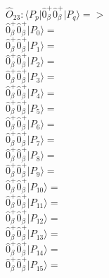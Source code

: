 \documentclass[14pt]{article}
\begin{document}
    $\hat{O}_{23}:  \langle{P_p}\vert \hat{0}_{\beta}^{+}\hat{0}_{\beta}^{+} \vert{P_q}\rangle => $ \\ 
    $ \hat{0}_{\beta}^{+}\hat{0}_{\beta}^{+} \vert{P_{0}}\rangle =  $ \\ 
    $ \hat{0}_{\beta}^{+}\hat{0}_{\beta}^{+} \vert{P_{1}}\rangle =  $ \\ 
    $ \hat{0}_{\beta}^{+}\hat{0}_{\beta}^{+} \vert{P_{2}}\rangle =  $ \\ 
    $ \hat{0}_{\beta}^{+}\hat{0}_{\beta}^{+} \vert{P_{3}}\rangle =  $ \\ 
    $ \hat{0}_{\beta}^{+}\hat{0}_{\beta}^{+} \vert{P_{4}}\rangle =  $ \\ 
    $ \hat{0}_{\beta}^{+}\hat{0}_{\beta}^{+} \vert{P_{5}}\rangle =  $ \\ 
    $ \hat{0}_{\beta}^{+}\hat{0}_{\beta}^{+} \vert{P_{6}}\rangle =  $ \\ 
    $ \hat{0}_{\beta}^{+}\hat{0}_{\beta}^{+} \vert{P_{7}}\rangle =  $ \\ 
    $ \hat{0}_{\beta}^{+}\hat{0}_{\beta}^{+} \vert{P_{8}}\rangle =  $ \\ 
    $ \hat{0}_{\beta}^{+}\hat{0}_{\beta}^{+} \vert{P_{9}}\rangle =  $ \\ 
    $ \hat{0}_{\beta}^{+}\hat{0}_{\beta}^{+} \vert{P_{10}}\rangle =  $ \\ 
    $ \hat{0}_{\beta}^{+}\hat{0}_{\beta}^{+} \vert{P_{11}}\rangle =  $ \\ 
    $ \hat{0}_{\beta}^{+}\hat{0}_{\beta}^{+} \vert{P_{12}}\rangle =  $ \\ 
    $ \hat{0}_{\beta}^{+}\hat{0}_{\beta}^{+} \vert{P_{13}}\rangle =  $ \\ 
    $ \hat{0}_{\beta}^{+}\hat{0}_{\beta}^{+} \vert{P_{14}}\rangle =  $ \\ 
    $ \hat{0}_{\beta}^{+}\hat{0}_{\beta}^{+} \vert{P_{15}}\rangle =  $ \\ 
    
\end{document}
